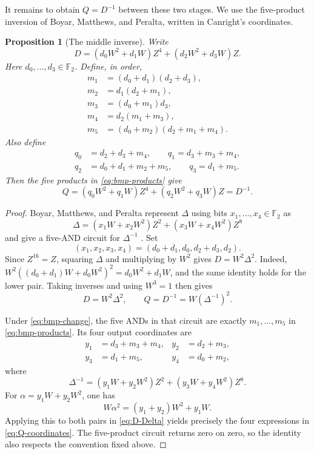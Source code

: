 \documentclass[11pt]{article}
\newtheorem{proposition}[theorem]{Proposition}
\newcommand{\F}{\mathbb F}
\begin{document}
It remains to obtain \(Q=D^{-1}\) between these two stages.  We use the
five-product inversion of Boyar, Matthews, and Peralta, written in
Canright's coordinates.

\begin{proposition}[The middle inverse]\label{prop:middle-inverse}
Write
\begin{equation}\label{eq:D-coordinates}
 D=(d_0W^2+d_1W)Z^4+(d_2W^2+d_3W)Z.
\end{equation}
Here \(d_0,\ldots,d_3\in\F_2\).
Define, in order,
\begin{equation}\label{eq:bmp-products}
\begin{aligned}
 m_1&=(d_0+d_1)(d_2+d_3),\\
 m_2&=d_1(d_2+m_1),\\
 m_3&=(d_0+m_1)d_3,\\
 m_4&=d_2(m_1+m_3),\\
 m_5&=(d_0+m_2)(d_2+m_1+m_4).
\end{aligned}
\end{equation}
Also define
\begin{equation}\label{eq:Q-coordinates}
 \begin{split}
 q_0&=d_2+d_3+m_4,\qquad
 q_1=d_3+m_3+m_4,\\
 q_2&=d_0+d_1+m_2+m_5,\qquad
 q_3=d_1+m_5.
 \end{split}
\end{equation}
Then the five products in \eqref{eq:bmp-products} give
\[
 Q=(q_0W^2+q_1W)Z^4+(q_2W^2+q_3W)Z=D^{-1}.
\]
\end{proposition}

\begin{proof}
Boyar, Matthews, and Peralta represent \(\Delta\) using bits
\(x_1,\ldots,x_4\in\F_2\) as
\[
 \Delta=(x_1W+x_2W^2)Z^2+(x_3W+x_4W^2)Z^8
\]
and give a five-AND circuit for \(\Delta^{-1}\)
\cite[Sec.~2.1, Fig.~2]{bmp}.  Set
\begin{equation}\label{eq:bmp-change}
 (x_1,x_2,x_3,x_4)=(d_0+d_1,d_0,d_2+d_3,d_2).
\end{equation}
Since \(Z^{16}=Z\), squaring \(\Delta\) and multiplying by \(W^2\)
gives \(D=W^2\Delta^2\).  Indeed,
\(W^2((d_0+d_1)W+d_0W^2)^2=d_0W^2+d_1W\), and the
same identity holds for the lower pair.
Taking inverses and using \(W^3=1\) then gives
\begin{equation}\label{eq:D-Delta}
 D=W^2\Delta^2,\qquad Q=D^{-1}=W(\Delta^{-1})^2.
\end{equation}

Under \eqref{eq:bmp-change}, the five ANDs in that circuit are exactly
\(m_1,\ldots,m_5\) in
\eqref{eq:bmp-products}.  Its four output coordinates are
\begin{align*}
 y_1&=d_3+m_3+m_4,& y_2&=d_2+m_3,\\
 y_3&=d_1+m_5,& y_4&=d_0+m_2,
\end{align*}
where
\[
 \Delta^{-1}=(y_1W+y_2W^2)Z^2+(y_3W+y_4W^2)Z^8.
\]
For \(\alpha=y_1W+y_2W^2\), one has
\[
 W\alpha^2=(y_1+y_2)W^2+y_1W.
\]
Applying this to both pairs in \eqref{eq:D-Delta} yields precisely the
four expressions in \eqref{eq:Q-coordinates}.  The five-product circuit
returns zero on zero, so the identity also respects the convention fixed
above.
\end{proof}
\end{document}
